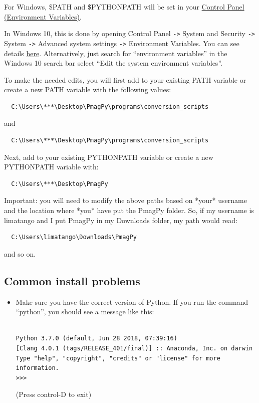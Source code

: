 \documentclass[11pt]{book}
\begin{document}
{For Windows, \$PATH and \$PYTHONPATH will be set in your \href{https://www.java.com/en/download/help/path.xml}{Control Panel (Environment Variables)}.

In Windows 10, this is done by opening Control Panel \verb|->| System and Security \verb|->| System \verb|->| Advanced system settings \verb|->| Environment Variables.  You can see details \href{https://www.java.com/en/download/help/path.xml}{here}.  Alternatively, just search for “environment variables” in the Windows 10 search bar select ``Edit the system environment variables''.

To make the needed edits, you will first add to your existing PATH variable or create a new PATH variable with the following values: \begin{verbatim}
  C:\Users\***\Desktop\PmagPy\programs\conversion_scripts
\end{verbatim}
and \begin{verbatim}
  C:\Users\***\Desktop\PmagPy\programs\conversion_scripts
\end{verbatim}
Next, add to your existing PYTHONPATH variable or create a new PYTHONPATH variable with: \begin{verbatim}
  C:\Users\***\Desktop\PmagPy
\end{verbatim}

Important: you will need to modify the above paths based on *your* username and the location where *you* have put the PmagPy folder.  So, if my username is limatango and I put PmagPy in my Downloads folder, my path would read: \begin{verbatim}
  C:\Users\limatango\Downloads\PmagPy
\end{verbatim}
and so on.

\subsection{Common install problems}

\begin{itemize}

\item Make sure you have the correct version of Python.  If you run the command ``python'', you should see a message like this:

\begin{verbatim}

Python 3.7.0 (default, Jun 28 2018, 07:39:16)
[Clang 4.0.1 (tags/RELEASE_401/final)] :: Anaconda, Inc. on darwin
Type "help", "copyright", "credits" or "license" for more information.
>>>
\end{verbatim}
(Press control-D to exit)


\end{itemize}}
\end{document}
